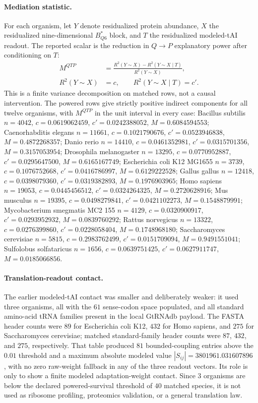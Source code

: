 \paragraph{Mediation statistic.}
For each organism, let $Y$ denote residualized protein abundance, $X$ the residualized nine-dimensional $B^*_{Q6}$ block, and $T$ the residualized modeled-tAI readout.  The reported scalar is the reduction in $Q\to P$ explanatory power after conditioning on $T$:
$$
\begin{aligned}
M^{QTP} &= \frac{R^2(Y\sim X)-R^2(Y\sim X\mid T)}{R^2(Y\sim X)},\\
R^2(Y\sim X)&=c,\qquad R^2(Y\sim X\mid T)=c'.
\end{aligned}
$$
This is a finite variance decomposition on matched rows, not a causal intervention.  The powered rows give strictly positive indirect components for all twelve organisms, with $M^{QTP}$ in the unit interval in every case: Bacillus subtilis $n=4042$, $c=0.0619062459$, $c'=0.0242388052$, $M=0.6084594553$; Caenorhabditis elegans $n=11661$, $c=0.1021790676$, $c'=0.0523946838$, $M=0.4872268357$; Danio rerio $n=14410$, $c=0.0461352981$, $c'=0.0315701356$, $M=0.3157053954$; Drosophila melanogaster $n=13295$, $c=0.0770952887$, $c'=0.0295647500$, $M=0.6165167749$; Escherichia coli K12 MG1655 $n=3739$, $c=0.1076752668$, $c'=0.0416786997$, $M=0.6129222528$; Gallus gallus $n=12418$, $c=0.0398079360$, $c'=0.0319382893$, $M=0.1976903965$; Homo sapiens $n=19053$, $c=0.0445456512$, $c'=0.0324264325$, $M=0.2720628916$; Mus musculus $n=19395$, $c=0.0498279841$, $c'=0.0421102273$, $M=0.1548879991$; Mycobacterium smegmatis MC2 155 $n=4129$, $c=0.0320900917$, $c'=0.0293952932$, $M=0.0839760292$; Rattus norvegicus $n=13322$, $c=0.0276399860$, $c'=0.0228058404$, $M=0.1748968180$; Saccharomyces cerevisiae $n=5815$, $c=0.2983762499$, $c'=0.0151709094$, $M=0.9491551041$; Sulfolobus solfataricus $n=1656$, $c=0.0639751425$, $c'=0.0627911747$, $M=0.0185066856$.

\paragraph{Translation-readout contact.}
The earlier modeled-tAI contact was smaller and deliberately weaker: it used three organisms, all with the $61$ sense-codon space populated, and all standard amino-acid tRNA families present in the local GtRNAdb payload.  The FASTA header counts were $89$ for Escherichia coli K12, $432$ for Homo sapiens, and $275$ for Saccharomyces cerevisiae; matched standard-family header counts were $87$, $432$, and $275$, respectively.  That table produced $81$ bounded-coupling entries above the $0.01$ threshold and a maximum absolute modeled value $|S_{ij}|=3801961.031607896$, with no zero raw-weight fallback in any of the three readout vectors.  Its role is only to show a finite modeled adaptation-weight contact.  Since $3$ organisms are below the declared powered-survival threshold of $40$ matched species, it is not used as ribosome profiling, proteomics validation, or a general translation law.

